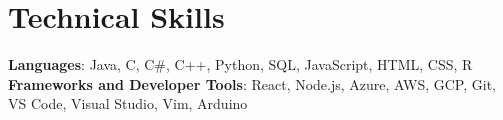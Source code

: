 \documentclass[letterpaper,11pt]{article}
\begin{document}
%
\section{Technical Skills}
 \begin{itemize}[leftmargin=0.15in, label={}]
    \small{\item{
     \textbf{Languages}{: Java, C, C\#, C++, Python, SQL, JavaScript, HTML, CSS, R} \\
     \textbf{Frameworks and Developer Tools}{: React, Node.js, Azure, AWS, GCP, Git, VS Code, Visual Studio, Vim, Arduino} \\
    }}
 \end{itemize}


\end{document}

